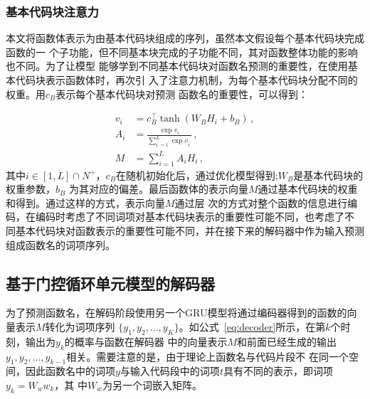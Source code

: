 \subsubsection{基本代码块注意力}
本文将函数体表示为由基本代码块组成的序列，虽然本文假设每个基本代码块完成函数的一
个子功能，但不同基本块完成的子功能不同，其对函数整体功能的影响也不同。为了让模型
能够学到不同基本代码块对函数名预测的重要性，在使用基本代码块表示函数体时，再次引
入了注意力机制，为每个基本代码块分配不同的权重。用$c_B$表示每个基本代码块对预测
函数名的重要性，可以得到：

\begin{align}
v_i &= c_B^\top \tanh(W_B H_i + b_B) \,, \\
A_i &= \frac{\exp{v_i}}{\sum_{i^\prime=1}^{L} \exp{v_{i^\prime}}} 
\,, \\
M &= \sum_{i=1}^{L} A_i H_i \,,
\label{eq:block_attn}
\end{align}
其中$i\in [1, L] \cap N^+$，$c_B$在随机初始化后，通过优化模型得到;$W_B$是基本代码块的权重参数，$b_B$
为其对应的偏差。最后函数体的表示向量$M$通过基本代码块的权重和得到。通过这样的方式，表示向量$M$通过层
次的方式对整个函数的信息进行编码，在编码时考虑了不同词项对基本代码块表示的重要性可能不同，也考虑了不
同基本代码块对函数表示的重要性可能不同，并在接下来的解码器中作为输入预测组成函数名的词项序列。

\subsection{基于门控循环单元模型的解码器}
为了预测函数名，在解码阶段使用另一个GRU模型将通过编码器得到的函数的向量表示$M$转化为词项序列
$\{y_1,y_2,...,y_K\}$。如公式~\eqref{eq:decoder}所示，在第$k$个时刻，输出为$y_k$的概率与函数在解码器
中的向量表示$M$和前面已经生成的输出$y_1,y_2,...,y_{k-1}$相关。需要注意的是，由于理论上函数名与代码片段不
在同一个空间，因此函数名中的词项$y$与输入代码段中的词项$t$具有不同的表示，即词项$y_k = W_w w_k$，其
中$W_w$为另一个词嵌入矩阵。

